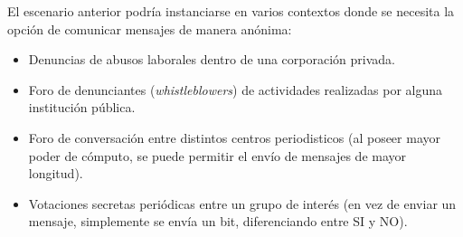 El escenario anterior podría instanciarse en varios contextos donde se necesita la opción 
de comunicar mensajes de manera anónima:
\begin{itemize}
	\item Denuncias de abusos laborales dentro de una corporación privada.
	\item Foro de denunciantes (\emph{whistleblowers}) de actividades 
	realizadas por alguna institución pública.
	\item Foro de conversación entre distintos centros periodisticos (al poseer mayor 
	poder de cómputo, se puede permitir el envío de mensajes de mayor longitud).
	\item Votaciones secretas periódicas entre un grupo de interés (en vez de enviar un mensaje, 
	simplemente se envía un bit, diferenciando entre SI y NO).
\end{itemize} 